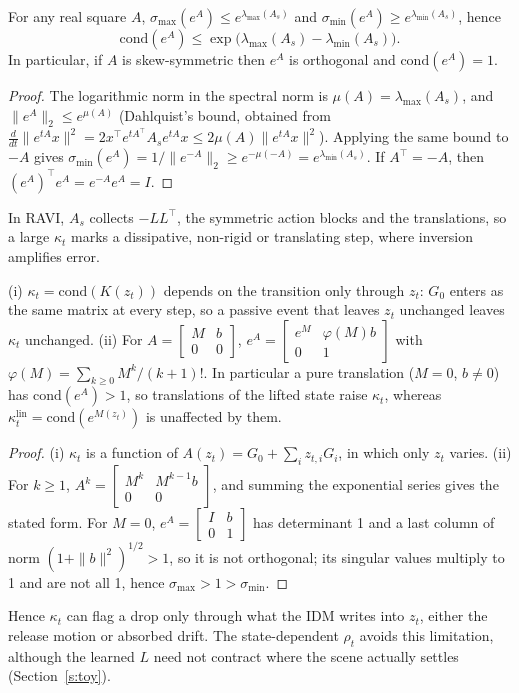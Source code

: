 \documentclass{jcse}
\newcommand{\method}{RAVI}
\newcommand{\cond}{\mathrm{cond}}
\newcommand{\klin}{\kappa^{\mathrm{lin}}}
\begin{document}
\begin{proposition}
\label{p:kappa}
For any real square $A$, $\sigma_{\max}(e^A)\le e^{\lambda_{\max}(A_s)}$ and $\sigma_{\min}(e^A)\ge e^{\lambda_{\min}(A_s)}$, hence
\begin{equation}
\cond(e^A)\le\exp\big(\lambda_{\max}(A_s)-\lambda_{\min}(A_s)\big).
\label{e:kappa}
\end{equation}
In particular, if $A$ is skew-symmetric then $e^A$ is orthogonal and $\cond(e^A)=1$.
\end{proposition}
\begin{proof}
The logarithmic norm in the spectral norm is $\mu(A)=\lambda_{\max}(A_s)$, and $\|e^{A}\|_2\le e^{\mu(A)}$ (Dahlquist's bound, obtained from $\frac{d}{dt}\|e^{tA}x\|^2=2x^\top e^{tA^\top}A_se^{tA}x\le2\mu(A)\|e^{tA}x\|^2$).
Applying the same bound to $-A$ gives $\sigma_{\min}(e^A)=1/\|e^{-A}\|_2\ge e^{-\mu(-A)}=e^{\lambda_{\min}(A_s)}$.
If $A^\top=-A$, then $(e^A)^\top e^A=e^{-A}e^A=I$.
\end{proof}
In {\method}, $A_s$ collects $-LL^\top$, the symmetric action blocks and the translations, so a large $\kappa_t$ marks a dissipative, non-rigid or translating step, where inversion amplifies error.

\begin{corollary}
\label{c:kappa}
(i) $\kappa_t=\cond(K(z_t))$ depends on the transition only through $z_t$: $G_0$ enters as the same matrix at every step, so a passive event that leaves $z_t$ unchanged leaves $\kappa_t$ unchanged.
(ii) For $A=\begin{bmatrix}M&b\\0&0\end{bmatrix}$, $e^A=\begin{bmatrix}e^M&\varphi(M)b\\0&1\end{bmatrix}$ with $\varphi(M)=\sum_{k\ge0}M^k/(k+1)!$.
In particular a pure translation ($M=0$, $b\neq0$) has $\cond(e^A)>1$, so translations of the lifted state raise $\kappa_t$, whereas $\klin_t=\cond(e^{M(z_t)})$ is unaffected by them.
\end{corollary}
\begin{proof}
(i) $\kappa_t$ is a function of $A(z_t)=G_0+\sum_iz_{t,i}G_i$, in which only $z_t$ varies.
(ii) For $k\ge1$, $A^k=\begin{bmatrix}M^k&M^{k-1}b\\0&0\end{bmatrix}$, and summing the exponential series gives the stated form.
For $M=0$, $e^A=\begin{bmatrix}I&b\\0&1\end{bmatrix}$ has determinant 1 and a last column of norm $(1+\|b\|^2)^{1/2}>1$, so it is not orthogonal; its singular values multiply to 1 and are not all 1, hence $\sigma_{\max}>1>\sigma_{\min}$.
\end{proof}
Hence $\kappa_t$ can flag a drop only through what the IDM writes into $z_t$, either the release motion or absorbed drift. The state-dependent $\rho_t$ avoids this limitation, although the learned $L$ need not contract where the scene actually settles (Section~\ref{s:toy}).
\end{document}
